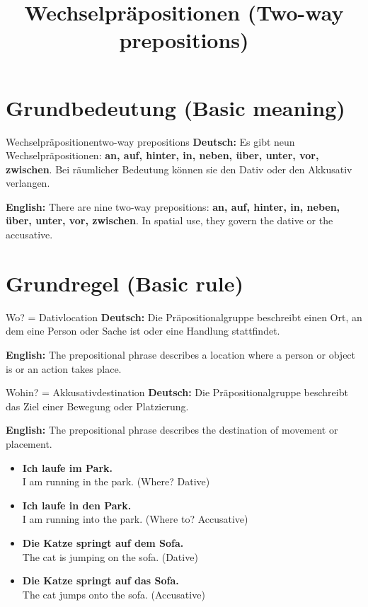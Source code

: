 \documentclass[a4paper,11pt]{article}
\title{Wechselpräpositionen (Two-way prepositions)}
\date{}
\newcommand{\GermanText}[1]{\textbf{Deutsch: }#1\par}
\newcommand{\EnglishText}[1]{{\small\color{SoftGray}\textbf{English: }#1\par}}
\newcommand{\ExampleItem}[2]{\item \textbf{#1}\\{\small\color{SoftGray}#2}}
\begin{document}
\maketitle
\tableofcontents
\newpage
\section{Grundbedeutung (Basic meaning)}
\begin{grammarentry}{Wechselpräpositionen}{two-way prepositions}
\GermanText{Es gibt neun Wechselpräpositionen: \textbf{an, auf, hinter, in, neben, über, unter, vor, zwischen}. Bei räumlicher Bedeutung können sie den Dativ oder den Akkusativ verlangen.}
\EnglishText{There are nine two-way prepositions: \textbf{an, auf, hinter, in, neben, über, unter, vor, zwischen}. In spatial use, they govern the dative or the accusative.}
\end{grammarentry}
\section{Grundregel (Basic rule)}
\begin{grammarentry}{Wo? = Dativ}{location}
\GermanText{Die Präpositionalgruppe beschreibt einen Ort, an dem eine Person oder Sache ist oder eine Handlung stattfindet.}
\EnglishText{The prepositional phrase describes a location where a person or object is or an action takes place.}
\end{grammarentry}
\begin{grammarentry}{Wohin? = Akkusativ}{destination}
\GermanText{Die Präpositionalgruppe beschreibt das Ziel einer Bewegung oder Platzierung.}
\EnglishText{The prepositional phrase describes the destination of movement or placement.}
\end{grammarentry}
\begin{exbox}
\begin{itemize}
\ExampleItem{Ich laufe im Park.}{I am running in the park. (Where? Dative)}
\ExampleItem{Ich laufe in den Park.}{I am running into the park. (Where to? Accusative)}
\ExampleItem{Die Katze springt auf dem Sofa.}{The cat is jumping on the sofa. (Dative)}
\ExampleItem{Die Katze springt auf das Sofa.}{The cat jumps onto the sofa. (Accusative)}
\end{itemize}
\end{exbox}
\end{document}

